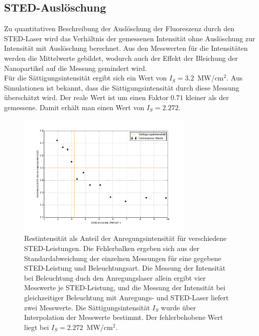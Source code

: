 \subsection{STED-Auslöschung}
Zu quantitativen Beschreibung der Auslöschung der Fluoreszenz durch den STED-Laser wird das Verhältnis der gemessenen Intensität ohne Auslöschung zur Intensität mit Auslöschung berechnet.
Aus den Messwerten für die Intensitäten werden die Mittelwerte gebildet, wodurch auch der Effekt der Bleichung der Nanopartikel auf die Messung gemindert wird.
\\
Für die Sättigungsintensität ergibt sich ein Wert von $I_S = 3.2$~MW/cm$^2$.
Aus Simulationen ist bekannt, dass die Sättigungsintensität durch diese Messung überschätzt wird. Der reale Wert ist um einen Faktor $0.71$ kleiner als der gemessene.
Damit erhält man einen Wert von $I_S = 2.272$.
\begin{figure}
	\centering
	\includegraphics[width=0.75\textwidth]{plots/depletion.pdf}
	\caption{Restintensität als Anteil der Anregungsintensität für verschiedene STED-Leistungen. 
		Die Fehlerbalken ergeben sich aus der Standardabweichung der einzelnen Messungen für eine gegebene STED-Leistung und Beleuchtungsart. 
		Die Messung der Intensität bei Beleuchtung duch den Anregungslaser allein ergibt vier Messwerte je STED-Leistung, und die Messung der Intensität bei gleichzeitiger Beleuchtung mit Anregungs- und STED-Laser liefert zwei Messwerte.
		Die Sättigungsintensität $I_S$ wurde über Interpolation der Messwerte bestimmt. 
		Der fehlerbehobene Wert liegt bei $I_S = 2.272$~MW/cm$^2$.
}\label{fig:depletion}
\end{figure}

